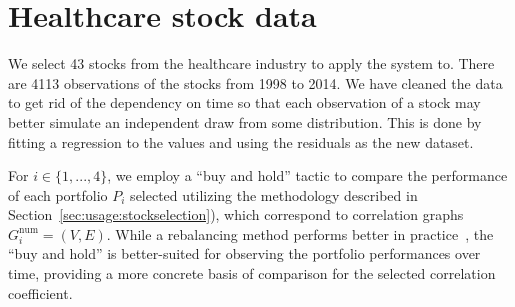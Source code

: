 \section{Healthcare stock data}
\label{sec:usage:data}

We select 43 stocks from the healthcare industry to apply the system to. There 
are 4113 observations of the stocks from 1998 to 2014. We have cleaned the data 
to get rid of the dependency on time so that each observation of a stock may 
better simulate an independent draw from some distribution. This is done by 
fitting a regression to the values and using the residuals as the new dataset.


For $i\in\{1,...,4\}$, 
we employ a ``buy and hold'' tactic to compare the performance of each 
portfolio $P_i$ selected utilizing the methodology described in 
Section~\ref{sec:usage:stockselection}), which correspond to correlation graphs 
$G_i^{\text{num}}=(V,E)$. While a rebalancing method performs better in 
practice~\cite{liuh2016}, the ``buy and hold'' is better-suited for observing 
the portfolio performances over time, providing a more concrete basis of 
comparison for the selected correlation coefficient.